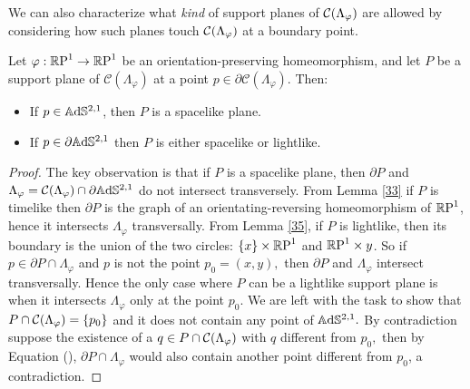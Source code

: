 We can also characterize what \textit{kind} of support planes of $\CF$ are allowed by considering how such planes touch $\CF$ at a boundary point. 
\begin{proposition}\label{supportinho}
    Let $\varphi:\S\to\S$ be an orientation-preserving homeomorphism, and let $P$ be a support plane of $\mathcal{C}(\Lambda_\varphi)$ at a point $p\in\partial\mathcal{C}(\Lambda_\varphi).$ Then:
    \begin{itemize}
        \item If $p\in\A^{2,1}$, then $P$ is a spacelike plane. 
        \item If $p\in\partial\A^{2,1}$ then $P$ is either spacelike or lightlike.
    \end{itemize}
\end{proposition}
\begin{proof}
    The key observation is that if $P$ is a spacelike plane, then $\partial P$ and $\Lambda_\varphi=\CF\cap\partial\A^{2,1}$ do not intersect transversely. From Lemma \ref{33} if $P$ is timelike then $\partial P$ is the graph of an orientating-reversing homeomorphism of $\S$, hence it intersects $\Lambda_\varphi$ transversally. From Lemma \ref{35}, if $P$ is lightlike, then its boundary is the union of the two circles: $\{x\}\times\S$ and $\S\times{y}$. So if $p\in\partial P\cap\Lambda_\varphi$ and $p$ is not the point $p_0=(x,y),$ then $\partial P$ and $\Lambda_\varphi$ intersect transversally. Hence the only case where $P$ can be a lightlike support plane is when it intersects $\Lambda_\varphi$ only at the point $p_0.$ We are left with the task to show that $P\cap\CF=\{p_0\}$ and it does not contain any point of $\A^{2,1}.$ By contradiction suppose the existence of a $q\in P\cap\CF$ with $q$ different from $p_0,$ then by Equation (), $\partial P\cap\Lambda_\varphi$ would also contain another point different from $p_0$, a contradiction.
\end{proof}

